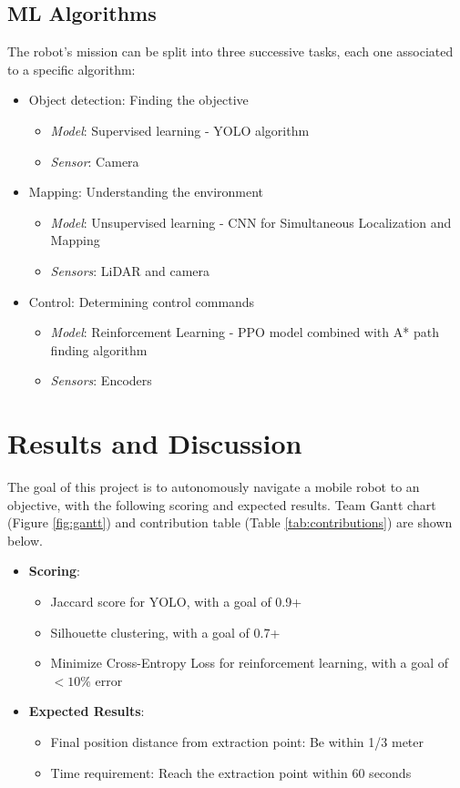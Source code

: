 \documentclass{article}
\begin{document}
\subsection{ML Algorithms}
The robot's mission can be split into three successive tasks, each one associated to a specific algorithm:
\begin{itemize}
    \item Object detection: Finding the objective
    \begin{itemize}
        \item \textit{Model}: Supervised learning - YOLO algorithm \cite{yolo}
        \item \textit{Sensor}: Camera
    \end{itemize}
    \item Mapping: Understanding the environment
    \begin{itemize}
        \item \textit{Model}: Unsupervised learning - CNN for Simultaneous Localization and Mapping \cite{SLAM}
        \item \textit{Sensors}: LiDAR and camera
    \end{itemize}
    \item Control: Determining control commands
    \begin{itemize}
        \item \textit{Model}: Reinforcement Learning - PPO model combined with A* path finding algorithm \cite{PPO_algo}
        \item \textit{Sensors}: Encoders
    \end{itemize}
\end{itemize}

\section{Results and Discussion} \label{sec:results}
The goal of this project is to autonomously navigate a mobile robot to an objective, with the following scoring and expected results. Team Gantt chart (Figure \ref{fig:gantt}) and contribution table (Table \ref{tab:contributions}) are shown below.\\
\begin{itemize}
\item \textbf{Scoring}:
\begin{itemize}
\item Jaccard score for YOLO, with a goal of 0.9+
\item Silhouette clustering, with a goal of 0.7+
\item Minimize Cross-Entropy Loss for reinforcement learning, with a goal of $<10\%$ error
\end{itemize}
\item \textbf{Expected Results}:
\begin{itemize}
\item Final position distance from extraction point: Be within 1/3 meter
\item Time requirement: Reach the extraction point within 60 seconds
\end{itemize}
\end{itemize}
\end{document}
